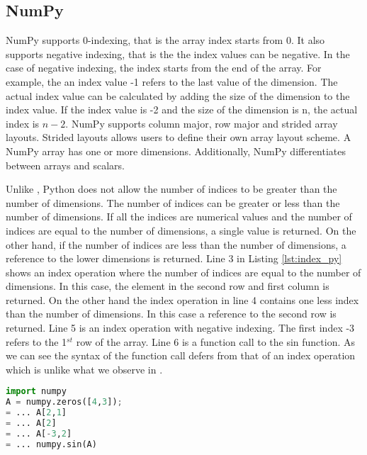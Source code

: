 \subsection{NumPy}
NumPy supports 0-indexing, that is the array index starts from 0. It also supports negative indexing, that is the the index values can be negative. In the case of negative indexing, the index starts from the end of the array. For example, the an index value \textsf{-1} refers to the last value of the dimension. The actual index value can be calculated by adding the size of the dimension to the index value. If the index value is -2 and the size of the dimension is n, the actual index is $n - 2$. NumPy supports column major, row major and strided array layouts. Strided layouts allows users to define their own array layout scheme. A NumPy array has one or more dimensions. Additionally, NumPy differentiates between arrays and scalars.

Unlike \matlab, Python does not allow the number of indices to be greater than the number of dimensions. The number of indices can be greater or less than the number of dimensions. If all the indices are numerical values and the number of indices are equal to the number of dimensions, a single value is returned. On the other hand, if the number of indices are less than the number of dimensions, a reference to the lower dimensions is returned. Line 3 in Listing \ref{lst:index_py} shows an index operation where the number of indices are equal to the number of dimensions. In this case, the element in the second row and first column is returned. On the other hand the index operation in line 4 contains one less index than the number of dimensions. In this case a reference to the second row is returned. Line 5 is an index operation with negative indexing. The first index -3 refers to the 1$^{st}$ row of the array.  Line 6 is a function call to the sin function. As we can see the syntax of the function call defers from that of an index operation which is unlike what we observe in \matlab. 
\begin{lstlisting}[language=python, label={lst:index_py}, caption={An example of indexing in NumPy}]
import numpy
A = numpy.zeros([4,3]);
= ... A[2,1]
= ... A[2]
= ... A[-3,2]
= ... numpy.sin(A)
\end{lstlisting}

